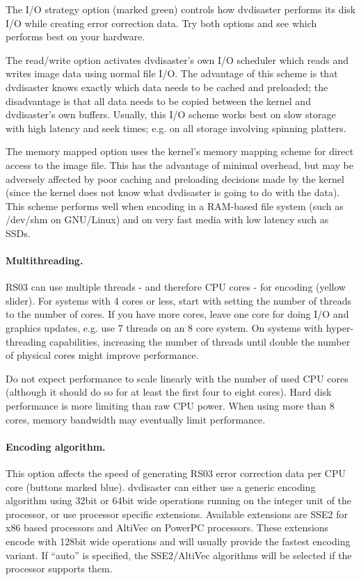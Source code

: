 \medskip

The I/O strategy option (marked green) controls how dvdisaster performs
its disk I/O while creating error correction data. Try both options and
see which performs best on your hardware.

The read/write option activates dvdisaster's own I/O scheduler which
reads and writes image data using normal file I/O. The advantage of this
scheme is that dvdisaster knows exactly which data needs to be cached and preloaded;
the disadvantage is that all data needs to be copied between the kernel and
dvdisaster's own buffers. Usually, this I/O scheme works best on slow
storage with high latency and seek times; e.g. on all storage involving spinning platters.

The memory mapped option uses the kernel's memory mapping scheme for direct access
to the image file. This has the advantage of minimal overhead, but may be
adversely affected by poor caching and preloading decisions made by the kernel
(since the kernel does not know what dvdisaster is going to do with the data).
This scheme performs well when encoding in a RAM-based file system
(such as /dev/shm on GNU/Linux) and on very fast media with low latency such as SSDs.

\paragraph{Multithreading.} RS03 can use multiple threads - and
therefore CPU cores - for encoding (yellow slider). For systems with 4 cores
or less, start with setting the number of threads to the number of cores.
If you have more cores, leave one core for doing I/O and graphics updates,
e.g. use 7 threads on an 8 core system. On systems with hyper-threading
capabilities, increasing the number of threads until double the number
of physical cores might improve performance.

\smallskip

Do not expect performance to scale linearly with the number of used
CPU cores (although it should do so for at least the first four to
eight cores). Hard disk performance is more limiting than raw CPU power.
When using more than 8 cores, memory bandwidth may eventually limit performance.

\paragraph{Encoding algorithm.} This option affects the speed of
generating RS03 error correction data per CPU core (buttons marked blue).
dvdisaster can either use a generic encoding algorithm using 32bit or 64bit
wide operations running on the integer unit of the processor,
or use processor specific extensions.
Available extensions are SSE2 for x86 based processors and AltiVec on
PowerPC processors. These extensions encode with 128bit wide operations
and will usually provide the fastest encoding variant.
If ``auto'' is specified, the SSE2/AltiVec algorithms will be selected
if the processor supports them. 

